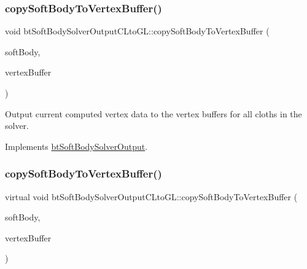 \subsubsection{\texorpdfstring{copy\+Soft\+Body\+To\+Vertex\+Buffer()}{copySoftBodyToVertexBuffer()}\hspace{0.1cm}{\footnotesize\ttfamily [1/2]}}
{\footnotesize\ttfamily void bt\+Soft\+Body\+Solver\+Output\+C\+Lto\+G\+L\+::copy\+Soft\+Body\+To\+Vertex\+Buffer (\begin{DoxyParamCaption}\item[{const \hyperlink{classbtSoftBody}{bt\+Soft\+Body} $\ast$const}]{soft\+Body,  }\item[{\hyperlink{classbtVertexBufferDescriptor}{bt\+Vertex\+Buffer\+Descriptor} $\ast$}]{vertex\+Buffer }\end{DoxyParamCaption})\hspace{0.3cm}{\ttfamily [virtual]}}

Output current computed vertex data to the vertex buffers for all cloths in the solver. 

Implements \hyperlink{classbtSoftBodySolverOutput_a7c3761747267f87da347aad276218663}{bt\+Soft\+Body\+Solver\+Output}.

\mbox{\label{classbtSoftBodySolverOutputCLtoGL_a4e5b99808b1072064295810529c7755a}} 
\subsubsection{\texorpdfstring{copy\+Soft\+Body\+To\+Vertex\+Buffer()}{copySoftBodyToVertexBuffer()}\hspace{0.1cm}{\footnotesize\ttfamily [2/2]}}
{\footnotesize\ttfamily virtual void bt\+Soft\+Body\+Solver\+Output\+C\+Lto\+G\+L\+::copy\+Soft\+Body\+To\+Vertex\+Buffer (\begin{DoxyParamCaption}\item[{const \hyperlink{classbtSoftBody}{bt\+Soft\+Body} $\ast$const}]{soft\+Body,  }\item[{\hyperlink{classbtVertexBufferDescriptor}{bt\+Vertex\+Buffer\+Descriptor} $\ast$}]{vertex\+Buffer }\end{DoxyParamCaption})\hspace{0.3cm}{\ttfamily [virtual]}}

